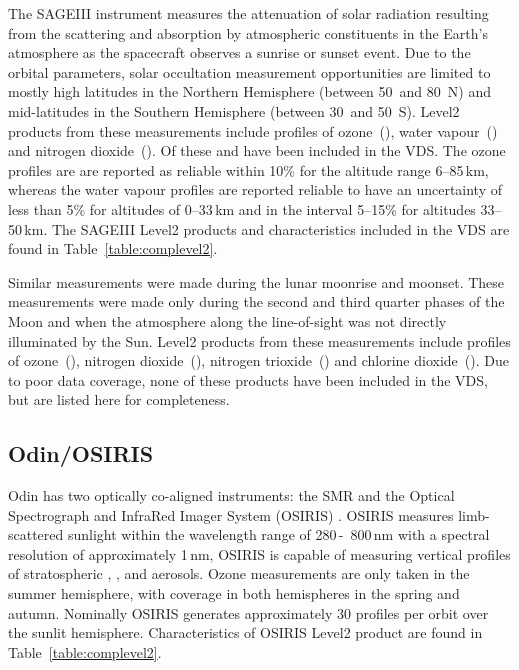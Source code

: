 The SAGEIII instrument measures the attenuation of solar radiation resulting
from the scattering and absorption by atmospheric constituents in the Earth's
atmosphere as the spacecraft observes a sunrise or sunset event.  Due to the
orbital parameters, solar occultation measurement opportunities are limited to
mostly high latitudes in the Northern Hemisphere (between 50\degree~and
80\degree~N) and mid-latitudes in the Southern Hemisphere (between
30\degree~and 50\degree~S).  Level2 products from these measurements include
profiles of ozone~(), water vapour~() and nitrogen
dioxide~().  Of these  and  have been included
in the VDS.  The ozone profiles are are reported as reliable within 10\% for
the altitude range 6--85\,km, whereas the water vapour profiles are reported
reliable to have an uncertainty of less than 5\% for altitudes of 0--33\,km and
in the interval 5--15\% for altitudes 33--50\,km. The SAGEIII Level2
products and characteristics included in the VDS are found in
Table~\ref{table:complevel2}.

Similar measurements were made during the lunar moonrise and moonset.  These
measurements were made only during the second and third quarter phases of
the Moon and when the atmosphere along the line-of-sight was not directly
illuminated by the Sun.  Level2 products from these measurements include
profiles of ozone~(), nitrogen dioxide~(), nitrogen
trioxide~() and chlorine dioxide~().  Due to poor data
coverage, none of these products have been included in the VDS, but are
listed here for completeness.

\subsection{Odin/OSIRIS}

Odin has two optically co-aligned instruments: the SMR 
and the Optical Spectrograph and InfraRed Imager System (OSIRIS)
\citep{llewellyn:osiris:04}. OSIRIS
measures limb-scattered sunlight within the wavelength range of 280\,-\,
800\,nm with a spectral resolution of approximately 1\,nm,
OSIRIS is capable of measuring vertical profiles of stratospheric 
, , and aerosols. 
Ozone measurements are only taken in the
summer hemisphere, with coverage in both hemispheres in
the spring and autumn.
Nominally OSIRIS generates approximately 30
 profiles per orbit over the sunlit hemisphere.
Characteristics of OSIRIS Level2  product
are found in Table~\ref{table:complevel2}.

